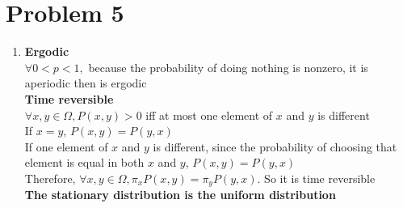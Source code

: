 \documentclass[12pt]{article}
\begin{document}
\section*{Problem 5}
\begin{enumerate}
\item
\textbf{Ergodic}\\

$\forall 0<p<1,$ because the probability of doing nothing is nonzero, it is aperiodic then is ergodic\\

\textbf{Time reversible}\\

$\forall x,y \in \Omega, P(x,y)>0$ iff at most one element of $x$ and $y$ is different\\
If $x=y$, $P(x,y)=P(y,x)$\\
If one element of $x$ and $y$ is different, since the probability of choosing that element is equal in both $x$ and $y$, $P(x,y)=P(y,x)$\\
Therefore, $\forall x,y\in \Omega, \pi_xP(x,y)=\pi_yP(y,x)$. So it is time reversible\\

\textbf{The stationary distribution is the uniform distribution}\\


\end{enumerate}
\end{document}
